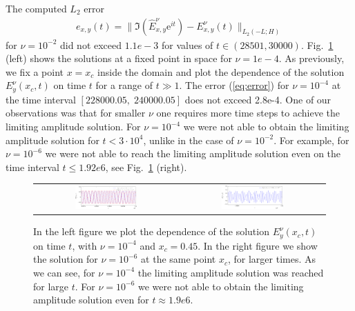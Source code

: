 \FloatBarrier
The computed $L_2$ error
\begin{align}
\label{eq:error}
e_{x,y}(t)=\|\Im\left(\hat{E}_{x,y}^{\nu}\mathrm{e}^{it}\right)-E_{x,y}^{\nu}(t)\|_{L_{2}(-L;H)}
\end{align}
for $\nu=10^{-2}$ did not exceed $1.1e-3$ for values of $t\in \left(28501,  30000\right)$. Fig.~\ref{fig:nu1e4_harmon} (left) shows the solutions at a fixed point in space for $\nu=1e-4$. As previously, 
 we fix a point $x=x_c$ inside the domain and plot 
the dependence of the solution $E_{y}^{\nu}(x_c,t)$ on time $t$ for a range of $t\gg 1$. 
The error (\ref{eq:error}) for $\nu=10^{-4}$ at the time interval $[228000.05,\; 240000.05]$ does not exceed 2.8e-4. 
One of our observations was that for smaller $\nu$ one requires more time steps to achieve the limiting amplitude solution. 
For $\nu=10^{-4}$ we were not able to obtain the limiting amplitude solution for $t<3\cdot 10^{4}$, unlike in the case of $\nu=10^{-2}$. 
For example, for $\nu=10^{-6}$ we were not able to reach the limiting amplitude solution even on the time interval $t\leq 1.92e6$, 
see Fig.~\ref{fig:nu1e4_harmon} (right). 
\begin{figure}
\begin{tabular}{cc}
 \includegraphics[width=0.45\textwidth]{pics_time_domain/airy/figure_nu1e4-crop.pdf}&
 \includegraphics[width=0.45\textwidth]{pics_time_domain/airy/figure_nu1e6-crop.pdf}\\
\end{tabular}
\caption{In the left figure we plot the dependence of the solution $E_{y}^{\nu}(x_c,t)$  on time $t$, with $\nu=10^{-4}$ and $x_c=0.45$. 
In the right figure we show the solution  for $\nu=10^{-6}$ at the same point $x_c$, for larger times. As we can see, for 
$\nu=10^{-4}$ the limiting amplitude solution was reached for large $t$. For $\nu=10^{-6}$ we were not able 
to obtain the limiting amplitude solution even for $t\approx 1.9e6$. }
  \label{fig:nu1e4_harmon}
\end{figure}

